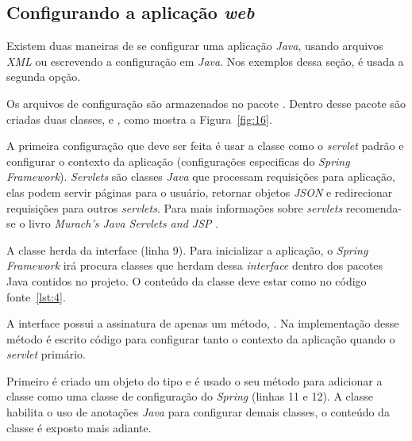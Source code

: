 
\subsection{Configurando a aplicação \textit{web}}

Existem duas maneiras de se configurar uma aplicação \textit{Java}, usando arquivos \textit{XML} ou escrevendo a configuração em \textit{Java}. Nos exemplos dessa seção, é usada a segunda opção.

Os arquivos de configuração são armazenados no pacote . Dentro desse pacote são criadas duas classes,  e , como mostra a Figura~\ref{fig:16}. 


A primeira configuração que deve ser feita é usar a classe  como o \textit{servlet} padrão e configurar o contexto da aplicação (configurações especificas do \textit{Spring Framework}). \textit{Servlets} são classes \textit{Java} que processam requisições para aplicação, elas podem servir páginas para o usuário, retornar objetos \textit{JSON} e redirecionar requisições para outros \textit{servlets}. Para mais informações sobre \textit{servlets} recomenda-se o livro \textit{Murach’s Java Servlets and JSP} \cite{10}.

A classe  herda da interface  (linha 9). Para inicializar a aplicação, o \textit{Spring Framework} irá procura classes que herdam dessa \textit{interface} dentro dos pacotes Java contidos no projeto. O conteúdo da classe deve estar como no código fonte~\ref{lst:4}.

A interface  possui a assinatura de apenas um método, . Na implementação desse método é escrito código para configurar tanto o contexto da aplicação quando o \textit{servlet} primário.

Primeiro é criado um objeto do tipo  e é usado o seu método  para adicionar a classe  como uma classe de configuração do \textit{Spring} (linhas 11 e 12). A classe  habilita o uso de anotações \textit{Java} para configurar demais classes, o conteúdo da classe  é exposto mais adiante.

